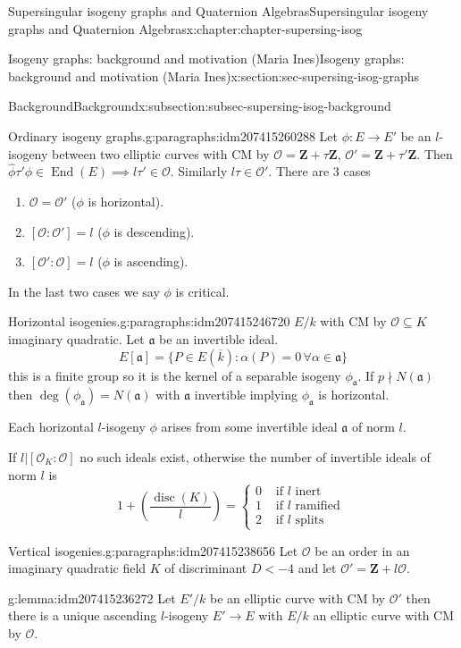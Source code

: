 \documentclass[oneside,10pt,]{book}
\numberwithin{equation}{section}
\newcommand{\ideal}[1]{\mathfrak{#1}}
\newcommand{\lb}{[}
\newcommand{\rb}{]}
\newcommand{\ZZ}{\mathbf{Z}}
\newcommand{\ints}{\mathcal{O}}
\DeclareMathOperator{\End}{End}
\DeclareMathOperator{\disc}{disc}
\newcommand{\lt}{<}
\newcommand{\amp}{&}
\begin{document}
\begin{chapterptx}{Supersingular isogeny graphs and Quaternion Algebras}{}{Supersingular isogeny graphs and Quaternion Algebras}{}{}{x:chapter:chapter-supersing-isog}
\begin{sectionptx}{Isogeny graphs: background and motivation (Maria Ines)}{}{Isogeny graphs: background and motivation (Maria Ines)}{}{}{x:section:sec-supersing-isog-graphs}
\begin{subsectionptx}{Background}{}{Background}{}{}{x:subsection:subsec-supersing-isog-background}
\begin{paragraphs}{Ordinary isogeny graphs.}{g:paragraphs:idm207415260288}
Let \(\phi\colon E\to E'\) be an \(l\)-isogeny between two elliptic curves with CM by \(\ints = \ZZ+\tau\ZZ\), \(\ints ' = \ZZ+\tau'\ZZ\). Then \(\hat\phi \tau' \phi \in \End(E) \implies l\tau ' \in \ints\). Similarly \(l\tau \in \ints'\). There are 3 cases%
\begin{enumerate}
\item{}\(\ints = \ints'\) (\(\phi\) is horizontal).%
\item{}\(\lb\ints : \ints' \rb = l\) (\(\phi\) is descending).%
\item{}\(\lb\ints' : \ints \rb = l\) (\(\phi\) is ascending).%
\end{enumerate}
In the last two cases we say \(\phi\) is critical.%
\end{paragraphs}%
\begin{paragraphs}{Horizontal isogenies.}{g:paragraphs:idm207415246720}%
\(E/k\) with CM by \(\ints \subseteq K\) imaginary quadratic. Let \(\ideal a\) be an invertible ideal.%
\begin{equation*}
E\lb \ideal a \rb = \{ P \in E(\overline k) : \alpha (P)  = 0\, \forall \alpha \in \ideal a\}
\end{equation*}
this is a finite group so it is the kernel of a separable isogeny \(\phi_{\ideal a }\). If \(p \nmid N(\ideal a)\) then \(\deg(\phi_{\ideal a}) = N(\ideal a)\) with \(\ideal a\) invertible implying \(\phi_{\ideal a} \) is horizontal.%
\par
Each horizontal \(l\)-isogeny \(\phi\) arises from some invertible ideal \(\ideal a\) of norm \(l\).%
\par
If \(l | \lb \ints_K : \ints \rb \) no such ideals exist, otherwise the number of invertible ideals of norm \(l\) is%
\begin{equation*}
1+ \left(\frac {\disc(K)}{l}\right) = \begin{cases}0\amp\text{ if }l \text{ inert }\\ 1\amp\text{ if }l \text{ ramified }\\ 2\amp\text{ if }l \text{ splits}\end{cases}
\end{equation*}
%
\end{paragraphs}%
\begin{paragraphs}{Vertical isogenies.}{g:paragraphs:idm207415238656}%
Let \(\ints\) be an order in an imaginary quadratic field \(K \) of discriminant \(D \lt -4\) and let \(\ints' = \ZZ+l\ints\).%
\begin{lemma}{}{}{g:lemma:idm207415236272}%
Let \(E' / k\)  be an elliptic curve with CM by \(\ints '\) then there is a  unique ascending \(l\)-isogeny \(E'\to E\) with \(E/k\) an elliptic curve with CM by \(\ints\).%

\end{lemma}
\end{paragraphs}
\end{subsectionptx}
\end{sectionptx}
\end{chapterptx}
\end{document}
